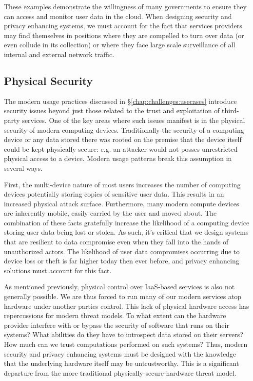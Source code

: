 These examples demonstrate the willingness of many governments to
ensure they can access and monitor user data in the cloud. When
designing security and privacy enhancing systems, we must account for
the fact that services providers may find themselves in positions
where they are compelled to turn over data (or even collude in its
collection) or where they face large scale surveillance of all
internal and external network traffic.

\subsection{Physical Security}

The modern usage practices discussed in
\S\ref{chap:challenges:usecases} introduce security issues beyond just
those related to the trust and exploitation of third-party
services. One of the key areas where such issues manifest is in the
physical security of modern computing devices. Traditionally the
security of a computing device or any data stored there was rooted on
the premise that the device itself could be kept physically secure:
e.g. an attacker would not posses unrestricted physical access to a
device. Modern usage patterns break this assumption in several ways.

First, the multi-device nature of most users increases the number of
computing devices potentially storing copies of sensitive user
data. This results in an increased physical attack
surface. Furthermore, many modern compute devices are inherently
mobile, easily carried by the user and moved about. The combination of
these facts gratefully increase the likelihood of a computing device
storing user data being lost or stolen. As such, it's critical that we
design systems that are resilient to data compromise even when they
fall into the hands of unauthorized actors. The likelihood of user
data compromises occurring due to device loss or theft is far higher
today then ever before, and privacy enhancing solutions must account
for this fact.

As mentioned previously, physical control over IaaS-based services is
also not generally possible. We are thus forced to run many of our
modern services atop hardware under another parties control. This lack
of physical hardware access has repercussions for modern threat
models. To what extent can the hardware provider interfere with or
bypass the security of software that runs on their systems? What
abilities do they have to introspect data stored on their servers? How
much can we trust computations performed on such systems?  Thus,
modern security and privacy enhancing systems must be designed with
the knowledge that the underlying hardware itself may be
untrustworthy. This is a significant departure from the more
traditional physically-secure-hardware threat model.

